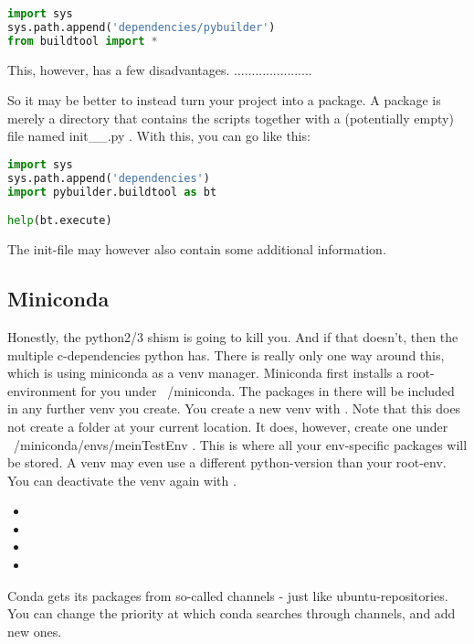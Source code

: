 \begin{lstlisting}[language=python]
import sys
sys.path.append('dependencies/pybuilder')
from buildtool import *
\end{lstlisting}

This, however, has a few disadvantages. ......................

So it may be better to instead turn your project into a package. A package is merely a directory that contains the scripts together with a (potentially empty) file named \verb __init__.py . With this, you can go like this:
\begin{lstlisting}[language=python]
import sys
sys.path.append('dependencies')
import pybuilder.buildtool as bt

help(bt.execute)
\end{lstlisting}

The init-file may however also contain some additional information. 


\subsection{Miniconda}
Honestly, the python2/3 shism is going to kill you. And if that doesn't, then the multiple c-dependencies python has. There is really only one way around this, which is using miniconda as a venv manager.
Miniconda first installs a root-environment for you under ~/miniconda. The packages in there will be included in any further venv you create. 
You create a new venv with . Note that this does not create a folder at your current location. It does, however, create one under ~/miniconda/envs/meinTestEnv . This is where all your env-specific packages will be stored. A venv may even use a different python-version than your root-env.
You can deactivate the venv again with .

\begin{itemize}
    \item {}
    \item {}
    \item {}
    \item {}
\end{itemize}

Conda gets its packages from so-called channels - just like ubuntu-repositories. You can change the priority at which conda searches through channels, and add new ones. 

